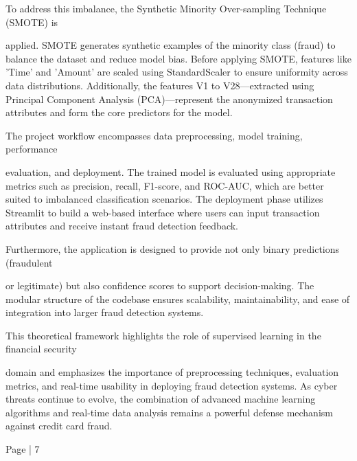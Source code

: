 \documentclass[11pt,a4paper]{article}
\begin{document}
         To address this imbalance, the Synthetic Minority Over-sampling Technique (SMOTE) is 

applied. SMOTE generates synthetic examples of the minority class (fraud) to balance the 
dataset and reduce model bias. Before applying SMOTE, features like 'Time' and 'Amount' 
are scaled using StandardScaler to ensure uniformity across data distributions. Additionally, 
the features V1 to V28—extracted using Principal Component Analysis (PCA)—represent 
the anonymized transaction attributes and form the core predictors for the model. 

         The project workflow encompasses data preprocessing, model training, performance 

evaluation, and deployment. The trained model is evaluated using appropriate metrics such 
as precision, recall, F1-score, and ROC-AUC, which are better suited to imbalanced 
classification scenarios. The deployment phase utilizes Streamlit to build a web-based 
interface where users can input transaction attributes and receive instant fraud detection 
feedback. 

         Furthermore, the application is designed to provide not only binary predictions (fraudulent 

or legitimate) but also confidence scores to support decision-making. The modular structure 
of the codebase ensures scalability, maintainability, and ease of integration into larger fraud 
detection systems. 

        This theoretical framework highlights the role of supervised learning in the financial security 

{\small domain and emphasizes the importance of preprocessing techniques, evaluation metrics, and 
real-time usability in deploying fraud detection systems. As cyber threats continue to evolve, 
the combination of advanced machine learning algorithms and real-time data analysis 
remains a powerful defense mechanism against credit card fraud. }

Page | 7  

\newpage
\end{document}
